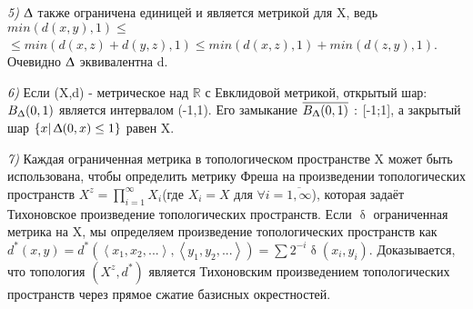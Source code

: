\par \textit{5)} $\Updelta$ также ограничена единицей и является метрикой для X, ведь $ min(d(x,y),1) \leq$\\
 $\leq min(d(x,z)+d(y,z),1) \leq min (d(x,z),1)+min(d(z,y),1)$. Очевидно $\Updelta$ эквивалентна d.
 
 \par \textit{6)} Если (X,d) - метрическое над $\mathds{R}$ с Евклидовой метрикой, открытый шар: $B_{\Updelta}(0,1)$ является интервалом (-1,1). Его замыкание $\overline{B_{\Updelta}(0,1)}\, :$  [-1;1], а закрытый шар $\{ x|\, \Updelta(0,x) \leq1\}$ равен X.
 \vspace{\baselineskip}
 \newpage
  \par \textit{7)}  Каждая ограниченная метрика в топологическом пространстве X может быть использована, чтобы определить метрику Фреша на произведении топологических пространств $X^{z}=\prod\limits_{i = 1}^{\infty}X_{i}$(где $X_{i}=X$ для $\forall i=\overline{1,\infty} $), которая задаёт Тихоновское произведение топологических пространств.  Если $\updelta $ ограниченная метрика на X, мы определяем произведение топологических пространств как $d^{*}(x,y)=d^{*}(\left\langle x_{1},x_{2},... \right\rangle,\left\langle y_{1},y_{2},... \right\rangle)=\sum 2^{-i} \updelta(x_{i},y_{i})$. Доказывается, что топология $(X^{z},d^{*})$ является Тихоновским произведением топологических пространств через прямое сжатие базисных окрестностей.
  \vspace{\baselineskip}
  
